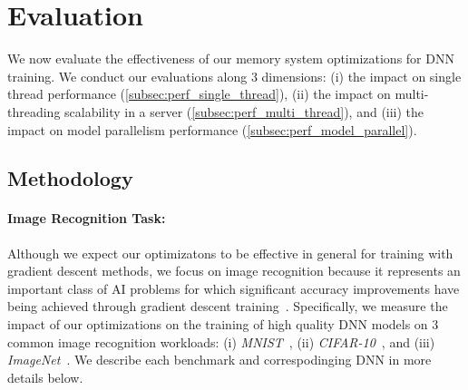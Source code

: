 \section{Evaluation}
\label{sec:eval}
We now evaluate the effectiveness of our memory system optimizations for DNN training.  We conduct our evaluations along $3$ dimensions: (i) the impact on single thread performance (\ref{subsec:perf_single_thread}), (ii) the impact on multi-threading scalability in a server (\ref{subsec:perf_multi_thread}), and (iii)  the impact on model parallelism performance (\ref{subsec:perf_model_parallel}).  

 \subsection{Methodology}
 \label{subsec:eval_method}
 
\paragraph{Image Recognition Task:}
Although we expect our optimizatons to be effective in general for training with gradient descent methods, we focus on image recognition because it represents an important class of AI problems for which significant accuracy improvements have being achieved through gradient descent training~\cite{Krizhevsky12, Le12, Dean12, Chilimbi14, He15}. Specifically, we measure the impact of our optimizations on the training of high quality DNN models on $3$ common image recognition workloads: (i) {\it MNIST}~\cite{Lecun98}, (ii) {\it CIFAR-10}~\cite{KrizhevskyThesis}, and (iii) {\it ImageNet}~\cite{imagenet09}. We describe each benchmark and correspodinging DNN in more details below. 
 

